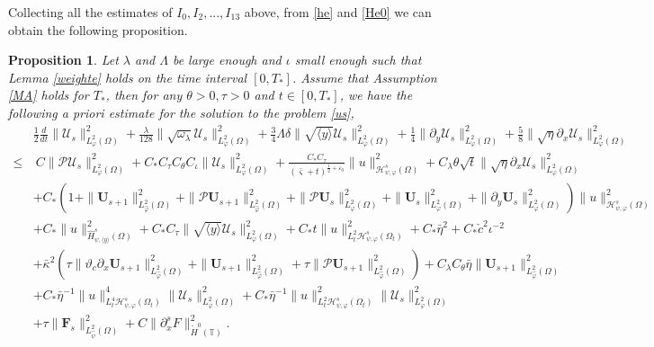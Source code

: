 \documentclass{amsart}
\numberwithin{equation}{section}
\newtheorem{prop}{Proposition}[section]
\newcommand\y{{{\langle y \rangle}}}
\begin{document}
Collecting all the estimates of $I_{0}, I_{2},..., I_{13}$ above, from \eqref{he} and \eqref{He0} we can obtain the following proposition.
\begin{prop}\label{highe}
Let $\lambda$ and $\Lambda$ be large enough and $\iota$ small enough such that Lemma \ref{weighte} holds on the time interval $[0,T_{*}]$. Assume that Assumption \ref{MA} holds for $T_{*}$, then for any $\theta>0, \tau>0$ and $t\in[0,T_{*}]$, we have the following a priori estimate for the solution to the problem \eqref{us},
\begin{align}\label{he'}
&\frac{1}{2}\frac{d}{dt}\|\mathcal{U}_{s}\|_{L_{\varphi}^{2}(\Omega)}^{2}
+\frac{\lambda}{128}\|\sqrt{\omega_{\lambda}}\mathcal{U}_{s}\|_{L_{\varphi}^{2}(\Omega)}^{2}
+\frac{3}{4}\Lambda\delta\|\sqrt{\y}\mathcal{U}_{s}\|_{L_{\varphi}^{2}(\Omega)}^{2}
+\frac{1}{4}\|\partial_{y}\mathcal{U}_{s}\|_{L_{\varphi}^{2}(\Omega)}^{2}
+\frac{5}{8}\|\sqrt{\eta}\partial_{x}\mathcal{U}_{s}\|_{L_{\varphi}^{2}(\Omega)}^{2}\\
\leq&~C\|\mathcal{P}\mathcal{U}_{s}\|_{L_{\varphi}^{2}(\Omega)}^{2}
     +C_{*}C_{\tau}C_{\theta}C_{\iota}\|\mathcal{U}_{s}\|_{L_{\varphi}^{2}(\Omega)}^{2}
     +\frac{C_{*}C_{\tau}}{(\bar{\varsigma}+t)^{\frac{1}{2}+\varepsilon_{0}}}\|u\|_{\mathcal{H}_{\psi,\varphi}^{s}(\Omega)}^{2}
     +C_{\lambda}\theta\sqrt{t}\|\sqrt{\eta}\partial_{x}\mathcal{U}_{s}\|_{L_{\varphi}^{2}(\Omega)}^{2}\nonumber\\
    &+C_{*}\left(1+\|\mathbf{U}_{s+1}\|_{L_{\hat{\varphi}}^{2}(\Omega)}^{2}
        +\|\mathcal{P}\mathbf{U}_{s+1}\|_{L_{\hat{\varphi}}^{2}(\Omega)}^{2}
        +\|\mathcal{P}\mathbf{U}_{s}\|_{L_{\varphi}^{2}(\Omega)}^{2}
        +\|\mathbf{U}_{s}\|_{L_{\varphi}^{2}(\Omega)}^{2}
        +\|\partial_{y}\mathbf{U}_{s}\|_{L_{\varphi}^{2}(\Omega)}^{2}\right)
       \|u\|_{\mathcal{H}_{\psi,\varphi}^{s}(\Omega)}^{2}\nonumber\\
    &+C_{*}\|u\|_{\hat{H}_{\psi,\y}^{s}(\Omega)}^{2}
     +C_{*}C_{\tau}\|\sqrt{\y}\mathcal{U}_{s}\|_{L_{\varphi}^{2}(\Omega)}^{2}
     +C_{*}t\|u\|_{L_{t}^{2}\mathcal{H}_{\psi,\varphi}^{s}(\Omega_{t})}^{2}
     +C_{*}\bar{\eta}^{2}
     +C_{*}\check{c}^{2}\iota^{-2}\nonumber\\
    &+\bar{\kappa}^{2}\left(\tau\|\vartheta_{c}\partial_{x}\mathbf{U}_{s+1}\|_{L_{\hat{\varphi}}^{2}(\Omega)}^{2}
               +\|\mathbf{U}_{s+1}\|_{L_{\hat{\varphi}}^{2}(\Omega)}^{2}
               +\tau\|\mathcal{P}\mathbf{U}_{s+1}\|_{L_{\hat{\varphi}}^{2}(\Omega)}^{2}\right)
     +C_{\lambda}C_{\theta}\bar{\eta}\|\mathbf{U}_{s+1}\|_{L_{\hat{\varphi}}^{2}(\Omega)}^{2}\nonumber\\
    &+C_{*}\bar{\eta}^{-1}\|u\|_{L_{t}^{4}\mathcal{H}_{\psi,\varphi}^{s}(\Omega_{t})}^{4}\|\mathcal{U}_{s}\|_{L_{\varphi}^{2}(\Omega)}^{2}
     +C_{*}\bar{\eta}^{-1}\|u\|_{L_{t}^{2}\mathcal{H}_{\psi,\varphi}^{s}(\Omega_{t})}^{2}\|\mathcal{U}_{s}\|_{L_{\varphi}^{2}(\Omega)}^{2}\nonumber\\
    &+\tau\|\mathbf{F}_{s}\|_{L_{\hat{\psi}}^{2}(\Omega)}^{2}
     +C\|\partial_{x}^{s}F\|_{\mathring{H}^{0}(\mathbb{T})}^{2}.\nonumber
\end{align}
\end{prop}
~~~~~~~~~~~
\end{document}
